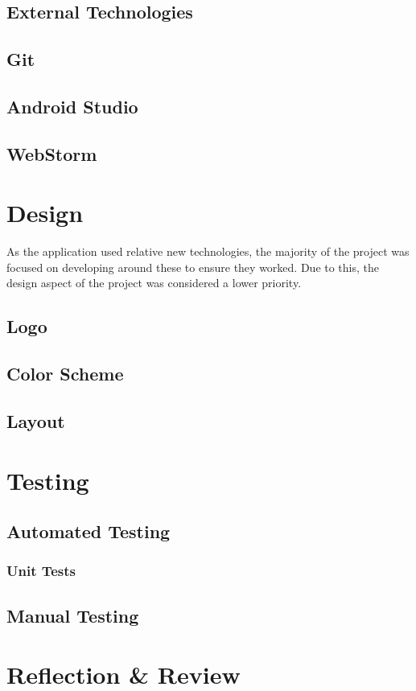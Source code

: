\documentclass[]{report}
\begin{document}
	\section{External Technologies}
		\section{Git}
		\section{Android Studio}
		\section{WebStorm}
		
\chapter{Design}
	As the application used relative new technologies, the majority of the project was focused on developing around these to ensure they worked. Due to this, the design aspect of the project was considered a lower priority.
	\section{Logo}
	\section{Color Scheme}
	\section{Layout}

\chapter{Testing}
	\section{Automated Testing}
		\subsection{Unit Tests}
	\section{Manual Testing}
	
\chapter{Reflection \& Review}
\end{document}
